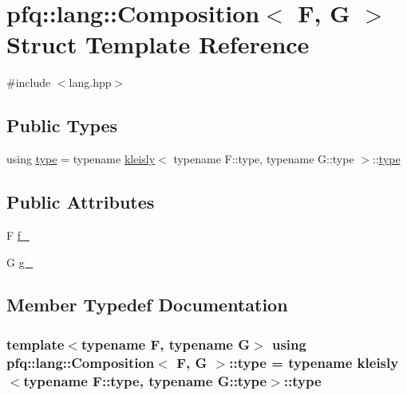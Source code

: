 \hypertarget{structpfq_1_1lang_1_1Composition}{\section{pfq\+:\+:lang\+:\+:Composition$<$ F, G $>$ Struct Template Reference}
\label{structpfq_1_1lang_1_1Composition}
}


{\ttfamily \#include $<$lang.\+hpp$>$}

\subsection*{Public Types}
\begin{DoxyCompactItemize}
\item 
using \hyperlink{structpfq_1_1lang_1_1Composition_aa426436e2a83824156469c75930bb542}{type} = typename \hyperlink{structpfq_1_1lang_1_1kleisly}{kleisly}$<$ typename F\+::type, typename G\+::type $>$\+::\hyperlink{structpfq_1_1lang_1_1Composition_aa426436e2a83824156469c75930bb542}{type}
\end{DoxyCompactItemize}
\subsection*{Public Attributes}
\begin{DoxyCompactItemize}
\item 
F \hyperlink{structpfq_1_1lang_1_1Composition_a347bd26bc6d78fe7540e7e5f641fe69d}{f\+\_\+}
\item 
G \hyperlink{structpfq_1_1lang_1_1Composition_aabe9600a5e6184509c5ac8ae9685271e}{g\+\_\+}
\end{DoxyCompactItemize}


\subsection{Member Typedef Documentation}
\hypertarget{structpfq_1_1lang_1_1Composition_aa426436e2a83824156469c75930bb542}{
\subsubsection[{type}]{\setlength{\rightskip}{0pt plus 5cm}template$<$typename F, typename G$>$ using {\bf pfq\+::lang\+::\+Composition}$<$ F, G $>$\+::{\bf type} =  typename {\bf kleisly}$<$typename F\+::type, typename G\+::type$>$\+::{\bf type}}}\label{structpfq_1_1lang_1_1Composition_aa426436e2a83824156469c75930bb542}


